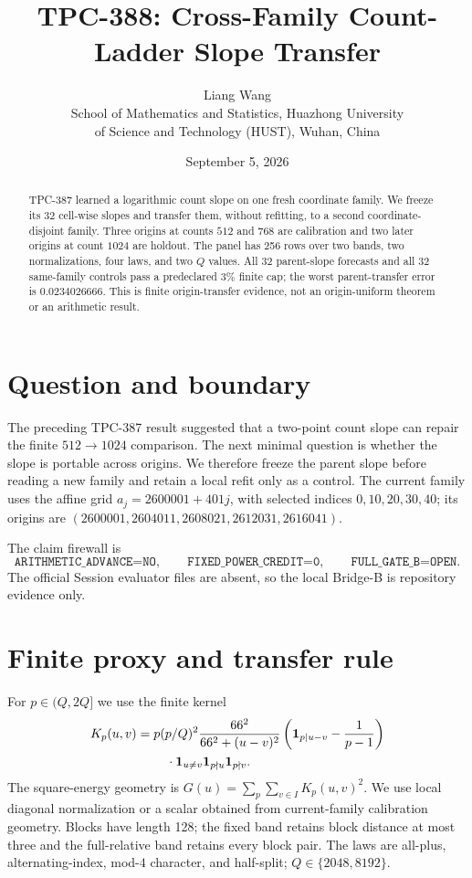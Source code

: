 \documentclass[10pt]{article}
\title{TPC-388: Cross-Family Count-Ladder Slope Transfer}
\author{Liang Wang\\
School of Mathematics and Statistics, Huazhong University\\
of Science and Technology (HUST), Wuhan, China}
\date{September 5, 2026}
\begin{document}
\maketitle

\begin{abstract}
TPC-387 learned a logarithmic count slope on one fresh coordinate family.
We freeze its 32 cell-wise slopes and transfer them, without refitting, to a
second coordinate-disjoint family.  Three origins at counts $512$ and $768$
are calibration and two later origins at count $1024$ are holdout.  The panel
has 256 rows over two bands, two normalizations, four laws, and two $Q$ values.
All 32 parent-slope forecasts and all 32 same-family controls pass a
predeclared 3\% finite cap; the worst parent-transfer error is
$0.0234026666$.  This is finite origin-transfer evidence, not an
origin-uniform theorem or an arithmetic result.
\end{abstract}

\section{Question and boundary}

The preceding TPC-387 result suggested that a two-point count slope can repair
the finite $512\to1024$ comparison.  The next minimal question is whether the
slope is portable across origins.  We therefore freeze the parent slope before
reading a new family and retain a local refit only as a control.  The current
family uses the affine grid $a_j=2600001+401j$, with selected indices
$0,10,20,30,40$; its origins are
$(2600001,2604011,2608021,2612031,2616041)$.

The claim firewall is
\[
 \texttt{ARITHMETIC\_ADVANCE=NO},\qquad
 \texttt{FIXED\_POWER\_CREDIT=0},\qquad
 \texttt{FULL\_GATE\_B=OPEN}.
\]
The official Session evaluator files are absent, so the local Bridge-B is
repository evidence only.

\section{Finite proxy and transfer rule}

For $p\in(Q,2Q]$ we use the finite kernel
\begin{align*}
 K_p(u,v)={}&p(p/Q)^2\frac{66^2}{66^2+(u-v)^2}
 \left({\bf 1}_{p\mid u-v}-\frac{1}{p-1}\right)\\
 &\quad\cdot{\bf 1}_{u\ne v}{\bf 1}_{p\nmid u}{\bf 1}_{p\nmid v}.
\end{align*}
The square-energy geometry is $G(u)=\sum_{p}\sum_{v\in I}K_p(u,v)^2$.
We use local diagonal normalization or a scalar obtained from current-family
calibration geometry.  Blocks have length 128; the fixed band retains block
distance at most three and the full-relative band retains every block pair.
The laws are all-plus, alternating-index, mod-$4$ character, and half-split;
$Q\in\{2048,8192\}$.
\end{document}
